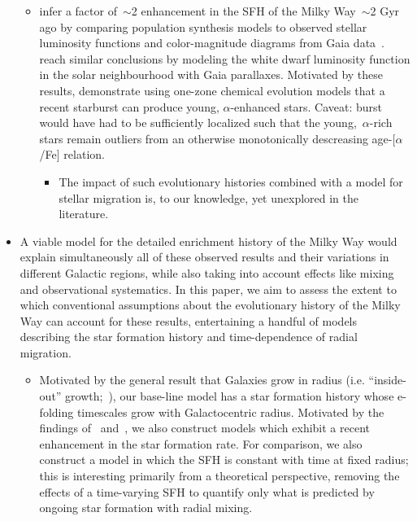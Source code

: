 \documentclass[fleqn, usenatbib]{mnras}
\begin{document}
\begin{itemize}
\begin{itemize}
		\item \citet{Mor2019} infer a factor of~$\sim$2 enhancement in the 
		SFH of the Milky Way~$\sim$2 Gyr ago by comparing population synthesis 
		models to observed stellar luminosity functions and color-magnitude 
		diagrams from Gaia data~\citep{GaiaDR2}.~\citet{Isern2019} reach 
		similar conclusions by modeling the white dwarf luminosity function in 
		the solar neighbourhood with Gaia parallaxes. Motivated by these 
		results, \citet{Johnson2020} demonstrate using one-zone chemical 
		evolution models that a recent starburst can produce young, 
		$\alpha$-enhanced stars. Caveat: burst would have had to be 
		sufficiently localized such that the young,~$\alpha$-rich stars remain 
		outliers from an otherwise monotonically descreasing age-[$\alpha$/Fe] 
		relation. 
		\begin{itemize} 
			\item The impact of such evolutionary histories combined with a 
			model for stellar migration is, to our knowledge, yet unexplored in 
			the literature. 
		\end{itemize} 
	\end{itemize} 

	\item A viable model for the detailed enrichment history of the Milky Way 
	would explain simultaneously all of these observed results and their 
	variations in different Galactic regions, while also taking into account 
	effects like mixing and observational systematics. In this paper, we aim to 
	assess the extent to which conventional assumptions about the evolutionary 
	history of the Milky Way can account for these results, entertaining a 
	handful of models describing the star formation history and time-dependence 
	of radial migration. 
	\begin{itemize} 
		\item Motivated by the general result that Galaxies grow in radius 
		(i.e. ``inside-out'' growth;~\citealp{Bird2013}), our base-line model 
		has a star formation history whose e-folding timescales grow with 
		Galactocentric radius. Motivated by the findings of~\citet{Mor2019} 
		and~\citet{Isern2019}, we also construct models which exhibit a recent 
		enhancement in the star formation rate. For comparison, we also 
		construct a model in which the SFH is constant with time at fixed 
		radius; this is interesting primarily from a theoretical perspective, 
		removing the effects of a time-varying SFH to quantify only what is 
		predicted by ongoing star formation with radial mixing. 


\end{itemize}
\end{itemize}
\end{document}
